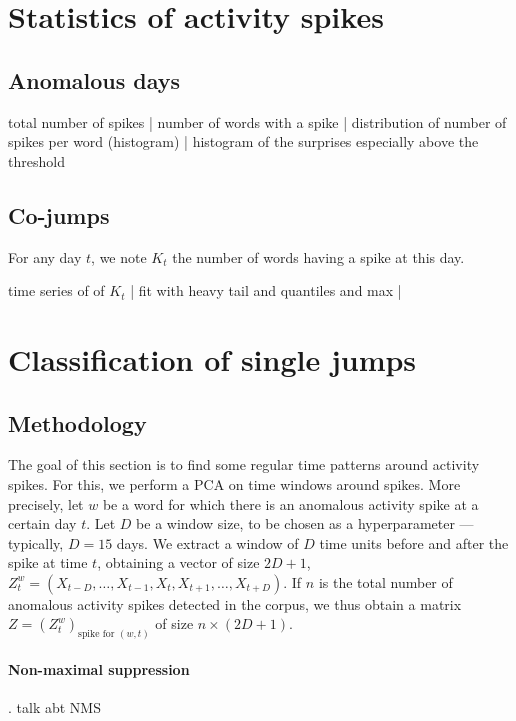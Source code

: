 \documentclass[11pt,a4paper]{article}
\begin{document}
\section{Statistics of activity spikes}
\label{sec:catalogue}

\subsection{Anomalous days}

total number of spikes | number of words with a spike | distribution of number of spikes per word (histogram) | histogram of the surprises especially above the threshold

\subsection{Co-jumps}

For any day $t$, we note $K_t$ the number of words having a spike at this day. 

time series of of $K_t$  | fit with heavy tail and quantiles and max | 


\section{Classification of single jumps}
\label{sec:single}

\subsection{Methodology}

The goal of this section is to find some regular time patterns around activity spikes. For this, we perform a PCA on time windows around spikes. More precisely, let $w$ be a word for which there is an anomalous activity spike at a certain day $t$. Let $D$ be a window size, to be chosen as a hyperparameter --- typically, $D = 15$ days. We extract a window of $D$ time units before and after the spike at time $t$, obtaining a vector of size $2D+1$, $Z^w_t = (X_{t-D}, \dots, X_{t-1}, X_t, X_{t+1}, \dots, X_{t+D})$. If $n$ is the total number of anomalous activity spikes detected in the corpus, we thus obtain a matrix $Z = (Z^w_t)_{\text{spike for }(w,t)}$ of size $n \times (2D+1)$. 

\paragraph{Non-maximal suppression}. talk abt NMS \cite{bodla2017soft}
\end{document}
